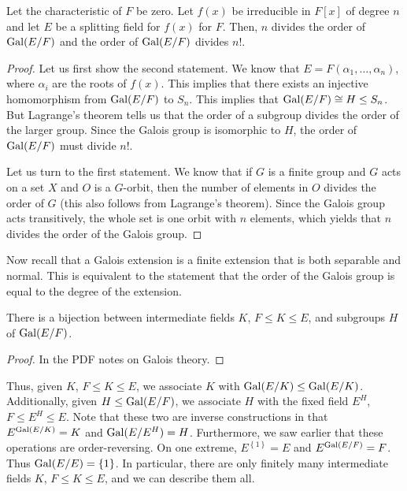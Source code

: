 \documentclass{../mathnotes}
\begin{document}
\begin{cor}
    Let the characteristic of $F$ be zero. Let $f(x)$ be irreducible in $F[x]$ of degree $n$ and let $E$ be a splitting field
    for $f(x)$ for $F$. Then, $n$ divides the order of $\operatorname{Gal}(E/F)$ and the order of $\operatorname{Gal}(E/F)$ divides $n!$.
\end{cor}
\begin{proof}
    Let us first show the second statement. We know that $E=F(\alpha_1,\ldots,\alpha_n)$, where $\alpha_i$ are the roots of $f(x)$.
    This implies that there exists an injective homomorphism from $\operatorname{Gal}(E/F)$ to $S_n$. This implies that $\operatorname{Gal}(E/F)\cong H\leq S_n$.
    But Lagrange's theorem tells us that the order of a subgroup divides the order of the larger group. Since the Galois group is isomorphic
    to $H$, the order of $\operatorname{Gal}(E/F)$ must divide $n!$.

    Let us turn to the first statement. We know that if $G$ is a finite group and $G$ acts on a set $X$ and $O$ is a $G$-orbit,
    then the number of elements in $O$ divides the order of $G$ (this also follows from Lagrange's theorem). Since the Galois group acts transitively,
    the whole set is one orbit with $n$ elements, which yields that $n$ divides the order of the Galois group.
\end{proof}

Now recall that a Galois extension is a finite extension that is both separable and normal. This is equivalent to the statement
that the order of the Galois group is equal to the degree of the extension.

\begin{thm}
    There is a bijection between intermediate fields $K$, $F\leq K\leq E$, and subgroups $H$ of $\operatorname{Gal}(E/F)$.
\end{thm}
\begin{proof}
    In the PDF notes on Galois theory.
\end{proof}

Thus, given $K$, $F\leq K\leq E$, we associate $K$ with $\operatorname{Gal}(E/K)\leq\operatorname{Gal}(E/K)$. Additionally, given $H\leq\operatorname{Gal}(E/F)$,
we associate $H$ with the fixed field $E^H$, $F\leq E^H\leq E$. Note that these two are inverse constructions in that
$E^{\operatorname{Gal}(E/K)}=K$ and $\operatorname{Gal}(E/E^H)=H$. Furthermore, we saw earlier that these operations are order-reversing.  
On one extreme, $E^{\left\{ 1 \right\}}=E$ and $E^{\operatorname{Gal}(E/F)}=F$. Thus $\operatorname{Gal}(E/E)=\left\{ 1 \right\}$.
In particular, there are only finitely many intermediate fields $K$, $F\leq K\leq E$, and we can describe them all.
\end{document}
